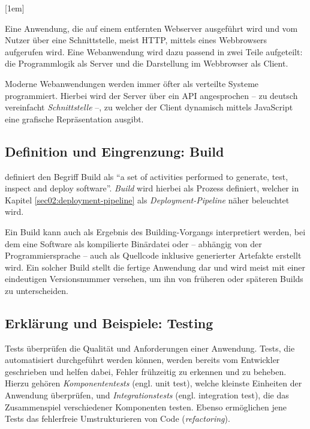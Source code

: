 [1em]

Eine Anwendung, die auf einem entfernten Webserver ausgeführt wird und vom Nutzer über eine Schnittstelle, meist \ac{HTTP}, mittels eines Webbrowsers aufgerufen wird. Eine Webanwendung wird dazu passend in zwei Teile aufgeteilt: die Programmlogik als Server und die Darstellung im Webbrowser als Client.

Moderne Webanwendungen werden immer öfter als verteilte Systeme programmiert. Hierbei wird der Server über ein \ac{API} angesprochen – zu deutsch vereinfacht \emph{Schnittstelle} –, zu welcher der Client dynamisch mittels JavaScript eine grafische Repräsentation ausgibt.


\subsection{Definition und Eingrenzung: Build} \label{ssec02:build}

\citet[27]{Duvall2007} definiert den Begriff Build als ``a set of activities performed to generate, test, inspect and deploy software''. \emph{Build} wird hierbei als Prozess definiert, welcher in Kapitel \ref{sec02:deployment-pipeline} als \emph{Deployment-Pipeline} näher beleuchtet wird.

Ein Build kann auch als Ergebnis des Building-Vorgangs interpretiert werden, bei dem eine Software als kompilierte Binärdatei oder – abhängig von der Programmiersprache – auch als Quellcode inklusive generierter Artefakte erstellt wird. Ein solcher Build stellt die fertige Anwendung dar und wird meist mit einer eindeutigen Versionsnummer versehen, um ihn von früheren oder späteren Builds zu unterscheiden.

\subsection{Erklärung und Beispiele: Testing}

Tests überprüfen die Qualität und Anforderungen einer Anwendung. Tests, die automatisiert durchgeführt werden können, werden bereits vom Entwickler geschrieben und helfen dabei, Fehler frühzeitig zu erkennen und zu beheben. Hierzu gehören \emph{Komponententests} (engl. unit test), welche kleinste Einheiten der Anwendung überprüfen, und \emph{Integrationstests} (engl. integration test), die das Zusammenspiel verschiedener Komponenten testen. Ebenso ermöglichen jene Tests das fehlerfreie Umstrukturieren von Code (\emph{refactoring}). \citep[104f]{Wolff2016}

